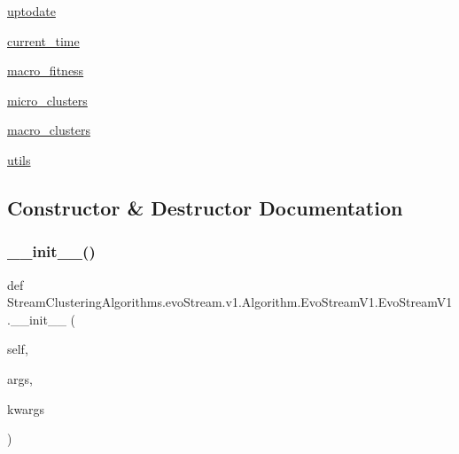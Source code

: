 \begin{DoxyCompactItemize}
\item 
\hyperlink{classStreamClusteringAlgorithms_1_1evoStream_1_1v1_1_1Algorithm_1_1EvoStreamV1_1_1EvoStreamV1_a63bf203d96c31a13ad645ef6dd2e2619}{uptodate}
\item 
\hyperlink{classStreamClusteringAlgorithms_1_1evoStream_1_1v1_1_1Algorithm_1_1EvoStreamV1_1_1EvoStreamV1_ab3bb06f047c2d39dc2f44a7aca98f91e}{current\+\_\+time}
\item 
\hyperlink{classStreamClusteringAlgorithms_1_1evoStream_1_1v1_1_1Algorithm_1_1EvoStreamV1_1_1EvoStreamV1_a9410090db1374e7d0f116dde1a177df2}{macro\+\_\+fitness}
\item 
\hyperlink{classStreamClusteringAlgorithms_1_1evoStream_1_1v1_1_1Algorithm_1_1EvoStreamV1_1_1EvoStreamV1_a17f1b10fbbed67abac36775b53ab8525}{micro\+\_\+clusters}
\item 
\hyperlink{classStreamClusteringAlgorithms_1_1evoStream_1_1v1_1_1Algorithm_1_1EvoStreamV1_1_1EvoStreamV1_ac7a5dd9d76aa16832e507782e14284d8}{macro\+\_\+clusters}
\item 
\hyperlink{classStreamClusteringAlgorithms_1_1evoStream_1_1v1_1_1Algorithm_1_1EvoStreamV1_1_1EvoStreamV1_a1335bbb4976a282c55b7d23631fadc4f}{utils}
\end{DoxyCompactItemize}


\subsection{Constructor \& Destructor Documentation}
\mbox{\label{classStreamClusteringAlgorithms_1_1evoStream_1_1v1_1_1Algorithm_1_1EvoStreamV1_1_1EvoStreamV1_a267ae54d21a6d55321f32dcdd62439aa}} 
\subsubsection{\texorpdfstring{\+\_\+\+\_\+init\+\_\+\+\_\+()}{\_\_init\_\_()}}
{\footnotesize\ttfamily def Stream\+Clustering\+Algorithms.\+evo\+Stream.\+v1.\+Algorithm.\+Evo\+Stream\+V1.\+Evo\+Stream\+V1.\+\_\+\+\_\+init\+\_\+\+\_\+ (\begin{DoxyParamCaption}\item[{}]{self,  }\item[{}]{args,  }\item[{}]{kwargs }\end{DoxyParamCaption})}



